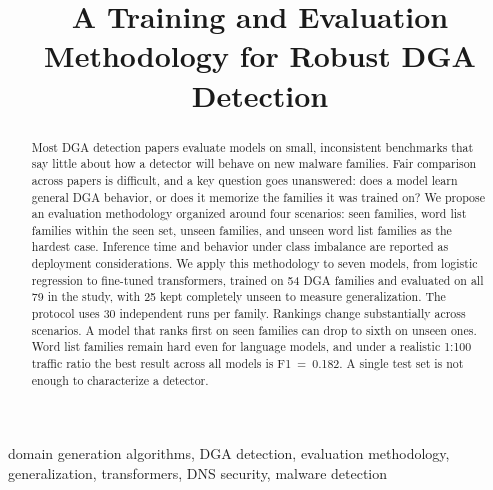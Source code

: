 \documentclass[conference]{IEEEtran}
\begin{document}
\title{A Training and Evaluation Methodology for Robust DGA Detection}

\author{
\and
{}
}

\maketitle

\begin{abstract}
Most DGA detection papers evaluate models on small, inconsistent benchmarks that say little about how a detector will behave on new malware families. Fair comparison across papers is difficult, and a key question goes unanswered: does a model learn general DGA behavior, or does it memorize the families it was trained on? We propose an evaluation methodology organized around four scenarios: seen families, word list families within the seen set, unseen families, and unseen word list families as the hardest case. Inference time and behavior under class imbalance are reported as deployment considerations. We apply this methodology to seven models, from logistic regression to fine-tuned transformers, trained on 54 DGA families and evaluated on all 79 in the study, with 25 kept completely unseen to measure generalization. The protocol uses 30 independent runs per family. Rankings change substantially across scenarios. A model that ranks first on seen families can drop to sixth on unseen ones. Word list families remain hard even for language models, and under a realistic 1:100 traffic ratio the best result across all models is F1~=~0.182. A single test set is not enough to characterize a detector.
\end{abstract}

\begin{IEEEkeywords}
domain generation algorithms, DGA detection, evaluation methodology, generalization, transformers, DNS security, malware detection
\end{IEEEkeywords}
\end{document}
